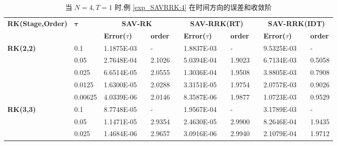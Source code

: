 \begin{table}[H]\scriptsize
\centering
\caption{当 $N=4, T = 1$ 时,例 \ref{exp_SAVRRK:4} 在时间方向的误差和收敛阶}
\begin{tabular}{lllllrlrlrlrlrl}
\toprule
\multicolumn{2}{l}{\multirow{2}[3]{*}{\textbf{RK(Stage,Order)}}} & \multicolumn{2}{l}{\multirow{2}[3]{*}{$\bm{\tau}$}} & \multicolumn{3}{c}{\textbf{SAV-RK}} &       & \multicolumn{3}{c}{\textbf{SAV-RRK(RT)}} &       & \multicolumn{3}{c}{\textbf{SAV-RRK(IDT)}} \\
\cmidrule{5-7}\cmidrule{9-11}\cmidrule{13-15}    \multicolumn{2}{l}{} & \multicolumn{2}{l}{} & \textbf{Error($\tau$)} &       & \textbf{order} &       & \textbf{Error($\tau$)} &       & \textbf{order} &       & \textbf{Error($\tau$)} &       & \textbf{order} \\
\hline
\multicolumn{2}{l}{\multirow{5}[0]{*}{\textbf{RK(2,2)}}} & \multicolumn{2}{l}{0.1} & 1.1875E-03 &       & -     &       & 1.8837E-03 &       & -     &       & 9.5325E-03 &       & - \\
\multicolumn{2}{l}{} & \multicolumn{2}{l}{0.05} & 2.7648E-04 &       & 2.1026  &       & 5.0394E-04 &       & 1.9023  &       & 6.7134E-03 &       & 0.5058  \\
\multicolumn{2}{l}{} & \multicolumn{2}{l}{0.025} & 6.6514E-05 &       & 2.0555  &       & 1.3036E-04 &       & 1.9508  &       & 3.8805E-03 &       & 0.7908  \\
\multicolumn{2}{l}{} & \multicolumn{2}{l}{0.0125} & 1.6300E-05 &       & 2.0288  &       & 3.3151E-05 &       & 1.9754  &       & 2.0757E-03 &       & 0.9026  \\
\multicolumn{2}{l}{} & \multicolumn{2}{l}{0.00625} & 4.0339E-06 &       & 2.0146  &       & 8.3587E-06 &       & 1.9877  &       & 1.0723E-03 &       & 0.9529  \\
\multicolumn{2}{l}{\multirow{5}[0]{*}{\textbf{RK(3,3)}}} & \multicolumn{2}{l}{0.1} & 8.7748E-05 &       & -     &       & 1.9567E-04 &       & -     &       & 3.1789E-03 &       & - \\
\multicolumn{2}{l}{} & \multicolumn{2}{l}{0.05} & 1.1471E-05 &       & 2.9354  &       & 2.4630E-05 &       & 2.9900  &       & 8.2646E-04 &       & 1.9435  \\
\multicolumn{2}{l}{} & \multicolumn{2}{l}{0.025} & 1.4684E-06 &       & 2.9657  &       & 3.0916E-06 &       & 2.9940  &       & 2.1079E-04 &       & 1.9712  \\

\end{tabular}
\end{table}
